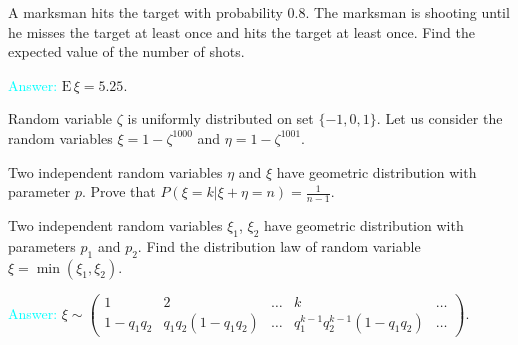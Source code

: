 \documentclass[14pt]{exam}
\def\E{{\textrm{E}}\,}
\begin{document}
\begin{questions}
		\question
		A marksman hits the target with probability $0.8$. The marksman is shooting until he misses the target at least once and hits the target at least once. Find the expected value of the number of shots.
		
		\textcolor{cyan}{Answer:} $\E\xi = 5.25$.
		
		\question
		Random variable $\zeta$ is uniformly distributed on set $\{-1, 0, 1\}$. Let us consider the random variables $\xi = 1 - \zeta^{1000}$ and $\eta = 1 - \zeta^{1001}$.
		
		
		\question
		Two independent random variables $\eta$ and $\xi$ have geometric distribution with parameter $p$. Prove that $P(\xi = k | \xi + \eta = n) = \frac{1}{n - 1}$.
		
		\question
		Two independent random variables $\xi_1$, $\xi_2$ have geometric distribution with parameters $p_1$ and $p_2$. Find the distribution law of random variable $\xi = \min(\xi_1, \xi_2)$.
		
		\textcolor{cyan}{Answer:} $\xi \sim \begin{pmatrix}
			1 & 2 & \dots & k & \dots\\
			1 - q_1q_2 & q_1q_2(1 - q_1q_2) & \dots & q_1^{k-1}q_2^{k - 1}(1 - q_1q_2) & \dots
		\end{pmatrix}$.
		

\end{questions}
\end{document}
